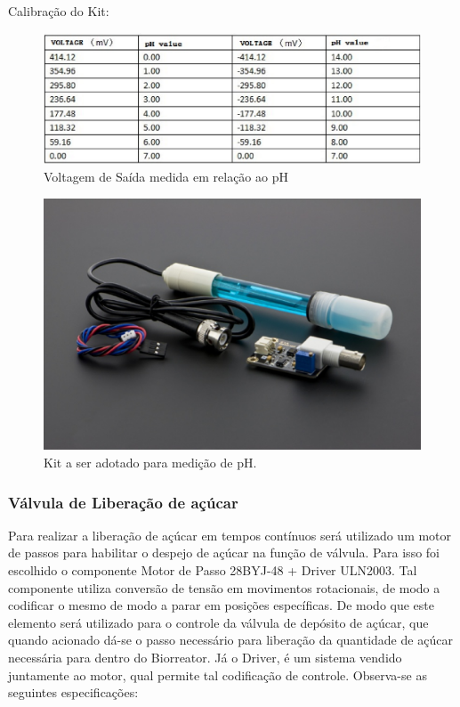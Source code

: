 Calibração do Kit:

\begin{figure}[h]
	\centering
	\includegraphics[keepaspectratio=true,scale=0.6]{figuras/ph.eps}
	\caption{Voltagem de Saída medida em relação ao pH}
	\label{ph}
\end{figure}

\begin{figure}[h]
	\centering
	\includegraphics[keepaspectratio=true,scale=0.3]{figuras/sensorph.eps}
	\caption{Kit a ser adotado para medição de pH.}
	\label{sensorph}
\end{figure}

\subsubsection{Válvula de Liberação de açúcar}

Para realizar a liberação de açúcar em tempos contínuos será utilizado um motor de passos para habilitar o despejo de açúcar na função de válvula. Para isso foi escolhido o componente Motor de Passo 28BYJ-48 + Driver ULN2003. Tal componente utiliza conversão de \nocite{ADS1115} tensão em movimentos rotacionais, de modo a codificar o mesmo de modo a parar em posições específicas. De modo que este elemento será utilizado para o controle da válvula de depósito de açúcar, que quando acionado dá-se o passo necessário para liberação da quantidade de açúcar necessária para dentro do Biorreator. Já o Driver, é um sistema vendido juntamente ao motor, qual permite tal codificação de controle. Observa-se as seguintes especificações: \nocite{SEN0161}

